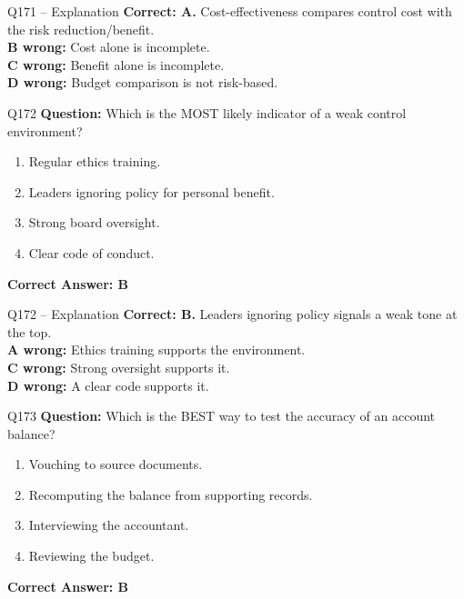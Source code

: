 \documentclass[aspectratio=169,10pt]{beamer}
\begin{document}
	\begin{frame}[t]{Q171 -- Explanation}
		\small
		\textbf{Correct: A.} Cost-effectiveness compares control cost with the risk reduction/benefit. \\[4pt]
		\textbf{B wrong:} Cost alone is incomplete. \\[2pt]
		\textbf{C wrong:} Benefit alone is incomplete. \\[2pt]
		\textbf{D wrong:} Budget comparison is not risk-based.
	\end{frame}
	
	\begin{frame}[t]{Q172}
		\small
		\textbf{Question:} Which is the MOST likely indicator of a weak control environment?
		\begin{enumerate}[label=\Alph*.,itemsep=1pt,topsep=2pt]
			\item Regular ethics training.
			\item Leaders ignoring policy for personal benefit.
			\item Strong board oversight.
			\item Clear code of conduct.
		\end{enumerate}
		\vspace{4pt}
		\textbf{Correct Answer: B}
	\end{frame}
	
	\begin{frame}[t]{Q172 -- Explanation}
		\small
		\textbf{Correct: B.} Leaders ignoring policy signals a weak tone at the top. \\[4pt]
		\textbf{A wrong:} Ethics training supports the environment. \\[2pt]
		\textbf{C wrong:} Strong oversight supports it. \\[2pt]
		\textbf{D wrong:} A clear code supports it.
	\end{frame}
	
	\begin{frame}[t]{Q173}
		\small
		\textbf{Question:} Which is the BEST way to test the accuracy of an account balance?
		\begin{enumerate}[label=\Alph*.,itemsep=1pt,topsep=2pt]
			\item Vouching to source documents.
			\item Recomputing the balance from supporting records.
			\item Interviewing the accountant.
			\item Reviewing the budget.
		\end{enumerate}
		\vspace{4pt}
		\textbf{Correct Answer: B}
	\end{frame}
	
\end{document}
